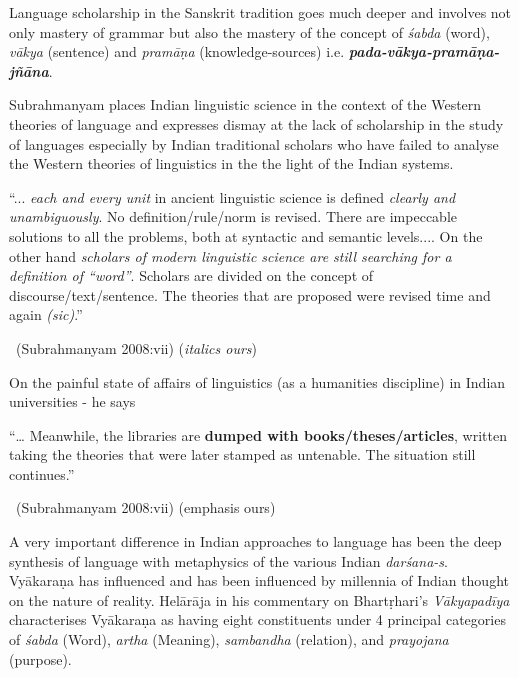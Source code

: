 Language scholarship in the Sanskrit tradition goes much deeper and involves not only mastery of grammar but also the mastery of the concept of \textit{śabda} (word), \textit{vākya} (sentence) and \textit{pramāṇa} (knowledge-sources) i.e. \textbf{\textit{pada-vākya-pramāṇa-jñāna}}.

Subrahmanyam places Indian linguistic science in the context of the Western theories of language and expresses dismay at the lack of scholarship in the study of languages especially by Indian traditional scholars who have failed to analyse the Western theories of linguistics in the the light of the Indian systems.

\begin{myquote}
“... \textit{each and every unit} in ancient linguistic science is defined \textit{clearly and unambiguously}. No definition/rule/norm is revised. There are impeccable solutions to all the problems, both at syntactic and semantic levels.... On the other hand \textit{scholars of modern linguistic science are still searching for a definition of “word”}. Scholars are divided on the concept of discourse/text/sentence. The theories that are proposed were revised time and again \textit{(sic)}.”

~\hfill (Subrahmanyam 2008:vii) (\textit{italics ours})
\end{myquote}

On the painful state of affairs of linguistics (as a humanities discipline) in Indian universities - he says

\begin{myquote}
“… Meanwhile, the libraries are \textbf{dumped with books/theses/articles}, written taking the theories that were later stamped as untenable. The situation still continues.”

~\hfill (Subrahmanyam 2008:vii) (emphasis ours)
\end{myquote}

A very important difference in Indian approaches to language has been the deep synthesis of language with metaphysics of the various Indian \textit{darśana-s}. Vyākaraṇa has influenced and has been influenced by millennia of Indian thought on the nature of reality. Helārāja in his commentary on Bhartṛhari’s \textit{Vākyapadīya} characterises Vyākaraṇa as having eight constituents under 4 principal categories of \textit{śabda} (Word), \textit{artha} (Meaning), \textit{sambandha}  (relation), and \textit{prayojana} (purpose).

